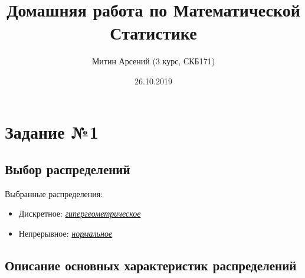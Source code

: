 \documentclass[
  russian,
  a4paper,
]{article}
\title{Домашняя работа по Математической Статистике}
\author{Митин Арсений (3 курс, СКБ171)}
\date{26.10.2019}
\providecommand{\tightlist}{%
  \setlength{\itemsep}{0pt}\setlength{\parskip}{0pt}}
\begin{document}
\maketitle

\newpage
{
\hypersetup{linkcolor=}
\setcounter{tocdepth}{2}
\tableofcontents
\newpage
}
\providecommand{\mathFunc}[4]{#1\left#2\, #3 \,\right#4}
\providecommand{\mathbbFunc}[4]{\mathFunc{\mathbb{#1}}{#2}{#3}{#4}}
\providecommand{\mathrmFunc}[4]{\mathFunc{\mathrm{#1}}{#2}{#3}{#4}}
\providecommand{\Prob}[1]{\mathbbFunc{P}{(}{#1}{)}}
\providecommand{\Expect}[1]{\mathbbFunc{E}{[}{#1}{]}}
\providecommand{\Var}[1]{\mathrmFunc{Var}{[}{#1}{]}}

\hypertarget{ux437ux430ux434ux430ux43dux438ux435-1}{%
\section{Задание №1}\label{ux437ux430ux434ux430ux43dux438ux435-1}}

\hypertarget{ux432ux44bux431ux43eux440-ux440ux430ux441ux43fux440ux435ux434ux435ux43bux435ux43dux438ux439}{%
\subsection{Выбор
распределений}\label{ux432ux44bux431ux43eux440-ux440ux430ux441ux43fux440ux435ux434ux435ux43bux435ux43dux438ux439}}

Выбранные распределения:

\begin{itemize}
\tightlist
\item
  Дискретное:
  \href{https://ru.wikipedia.org/wiki/Гипергеометрическое_распределение}{\emph{гипергеометрическое}}
\item
  Непрерывное:
  \href{https://ru.wikipedia.org/wiki/Нормальное_распределение}{\emph{нормальное}}
\end{itemize}

\hypertarget{ux43eux43fux438ux441ux430ux43dux438ux435-ux43eux441ux43dux43eux432ux43dux44bux445-ux445ux430ux440ux430ux43aux442ux435ux440ux438ux441ux442ux438ux43a-ux440ux430ux441ux43fux440ux435ux434ux435ux43bux435ux43dux438ux439}{%
\subsection{Описание основных характеристик
распределений}\label{ux43eux43fux438ux441ux430ux43dux438ux435-ux43eux441ux43dux43eux432ux43dux44bux445-ux445ux430ux440ux430ux43aux442ux435ux440ux438ux441ux442ux438ux43a-ux440ux430ux441ux43fux440ux435ux434ux435ux43bux435ux43dux438ux439}}
\end{document}
